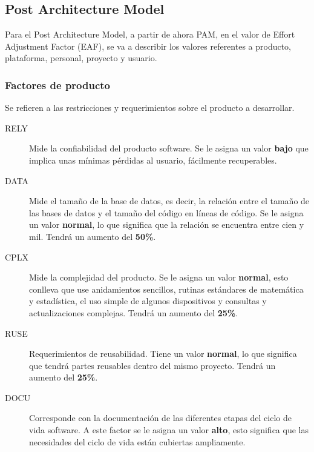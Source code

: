 \documentclass[11pt,a4paper,spanish,twoside]{book}
\begin{document}
\subsection{Post Architecture Model}
Para el Post Architecture Model, a partir de ahora PAM, en el valor de Effort
Adjustment Factor (EAF), se va a describir los valores referentes a producto,
plataforma, personal, proyecto y usuario. 
\subsubsection{Factores de producto}
Se refieren a las restricciones y requerimientos sobre el producto a
desarrollar.
\begin{description}
\item[RELY] Mide la confiabilidad del producto software. Se le asigna un 
valor \textbf{bajo} que implica unas mínimas pérdidas al usuario,
fácilmente recuperables.

\item[DATA] Mide el tamaño de la base de datos, es decir, la relación entre
el tamaño de las bases de datos y el tamaño del código en líneas de código. Se
le asigna un valor \textbf{normal}, lo que significa que la relación se
encuentra entre cien y mil. Tendrá un aumento del \textbf{50\%}. 

\item[CPLX] Mide la complejidad del producto. Se le asigna un
valor \textbf{normal}, esto conlleva que use anidamientos sencillos, rutinas
estándares de matemática y estadística, el uso simple de algunos dispositivos
y consultas y actualizaciones complejas. Tendrá un aumento del 
\textbf{25\%}.

\item[RUSE] Requerimientos de reusabilidad. Tiene un valor \textbf{normal},
lo que significa que tendrá partes reusables dentro del mismo
proyecto. Tendrá un aumento del \textbf{25\%}.

\item[DOCU] Corresponde con la documentación de las diferentes etapas del
ciclo de vida software. A este factor se le asigna un valor \textbf{alto},
esto significa que las necesidades del ciclo de vida están cubiertas
ampliamente.

\end{description}
\end{document}

